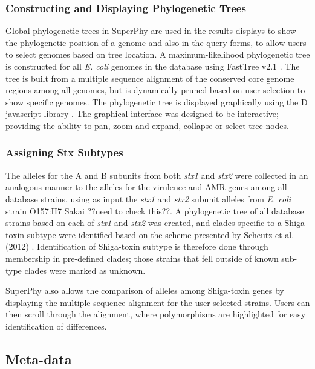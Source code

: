 \documentclass[a4paper,twoside]{article}
\begin{document}
\subsubsection{Constructing and Displaying Phylogenetic Trees}

Global phylogenetic trees in SuperPhy are used in the results displays to show the phylogenetic position of a genome and also in the query forms, to allow users to select genomes based on tree location. A maximum-likelihood phylogenetic tree is constructed for all \textit{E. coli} genomes in the database using FastTree v2.1 \cite{price_fasttree_2010}. The tree is built from a multiple sequence alignment of the conserved core genome regions among all genomes, but is dynamically pruned based on user-selection to show specific genomes. The phylogenetic tree is displayed graphically using the D javascript library \cite{bostock2011d3}. The graphical interface was designed to be interactive; providing the ability to pan, zoom and expand, collapse or select tree nodes.

\subsubsection{Assigning Stx Subtypes}

The alleles for the A and B subunits from both \textit{stx1} and \textit{stx2} were collected in an analogous manner to the alleles for the virulence and AMR genes among all database strains, using as input the \textit{stx1} and \textit{stx2} subunit alleles from \textit{E. coli} strain O157:H7 Sakai ??need to check this??. A phylogenetic tree of all database strains based on each of \textit{stx1} and \textit{stx2} was created, and clades specific to a Shiga-toxin subtype were identified based on the scheme presented by Scheutz et al. (2012) \cite{scheutz_multicenter_2012}. Identification of Shiga-toxin subtype is therefore done through membership in pre-defined clades; those strains that fell outside of known sub-type clades were marked as unknown.

SuperPhy also allows the comparison of alleles among Shiga-toxin genes by displaying the multiple-sequence alignment for the user-selected strains. Users can then scroll through the alignment, where polymorphisms are highlighted for easy identification of differences.

\subsection{Meta-data}
\end{document}
